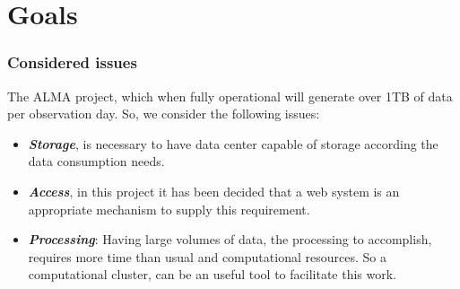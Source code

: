 \section{Goals}

\begin{frame}
\frametitle{Considered issues}

The ALMA project, which when fully operational will generate over 1TB of data per observation day. So, we consider the
following issues:

\begin{itemize}
	\item \emph{\textbf{Storage}}, is necessary to have data center capable of storage according the data consumption needs.
	\item \emph{\textbf{Access}}, in this project it has been decided that a web system is an appropriate mechanism to supply 
		this requirement.
	\item \emph{\textbf{Processing}}: Having large volumes of data, the processing to accomplish, requires more time than usual 
		and computational resources. So a computational cluster, can be an useful tool to facilitate this work.
\end{itemize}

\end{frame}
